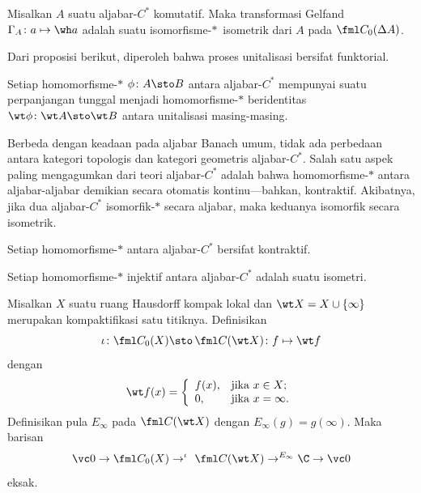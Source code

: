 \begin{thm}\label{00152156} Misalkan $A$ suatu aljabar-$C^*$
komutatif.
Maka transformasi Gelfand $\Gamma_A\colon a \mapsto \wh a$ adalah suatu
isomorfisme-$*\,$ isometrik dari $A$ pada $\fml C_0(\Delta A)$.
\end{thm}

Dari proposisi berikut, diperoleh bahwa proses unitalisasi bersifat funktorial.

\begin{prop} \label{00152161} Setiap homomorfisme-$*$ $\phi\colon A \sto B$ antara
aljabar-$C^*$ mempunyai suatu perpanjangan tunggal menjadi homomorfisme-$*$ beridentitas
$\wt \phi\colon \wt A \sto \wt B$ antara unitalisasi masing-masing.
\end{prop}

Berbeda dengan keadaan pada aljabar Banach umum, tidak ada perbedaan antara kategori
topologis dan kategori geometris aljabar-$C^*$. Salah satu aspek paling mengagumkan dari
teori aljabar-$C^*$ adalah bahwa homomorfisme-$*$ antara aljabar-aljabar demikian secara
otomatis kontinu---bahkan, kontraktif. Akibatnya, jika dua aljabar-$C^*$ isomorfik-$*$
secara aljabar, maka keduanya isomorfik secara isometrik.

\begin{prop}\label{00152171} Setiap homomorfisme-$*$ antara aljabar-$C^*$ bersifat kontraktif.
\end{prop}

\begin{prop}\label{00152181} Setiap homomorfisme-$*$ injektif antara aljabar-$C^*$ adalah
suatu isometri.
\end{prop}

\begin{prop}\label{00152191} Misalkan $X$ suatu ruang Hausdorff kompak lokal dan
$\wt X = X \cup \{\infty\}$ merupakan kompaktifikasi satu titiknya. Definisikan
  \[ \iota\colon \fml C_0(X) \sto \,\fml C(\wt X)\colon f \mapsto \wt f \]
dengan
 \[ \wt f(x) = \left\{%
  \begin{array}{ll}
     f(x), & \hbox{jika $x \in X$;} \\
     0, & \hbox{jika $x = \infty$.} \\
  \end{array}%
            \right. \]
Definisikan pula $E_\infty$ pada $\fml C(\wt X)$ dengan $E_\infty(g) = g(\infty)$. Maka
barisan
  \[ \vc 0 \to \fml C_0(X) \to^\iota \,\,\fml C(\wt X)
                                        \to^{E_\infty} \C \to \vc 0 \]
eksak.
\end{prop}

